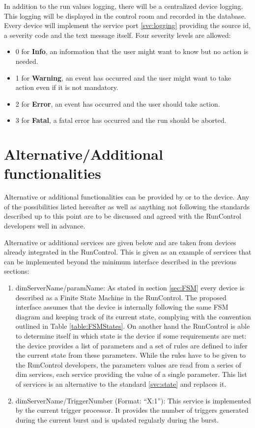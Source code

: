 \documentclass[a4paper]{article}
\begin{document}
In addition to the run values logging, there will be a centralized device logging. This logging will
be displayed in the control room and recorded in the database. Every device will implement the
service port \ref{svc:logging} providing the source id, a severity code and the
text message itself. Four severity levels are allowed:
\begin{itemize}
	\item 0 for \textbf{Info}, an information that the user might want to know but
	no action is needed.
	\item 1 for \textbf{Warning}, an event has occurred and the user might want to
	take action even if it is not mandatory.
	\item 2 for \textbf{Error}, an event has occurred and the user should take
	action.
	\item 3 for \textbf{Fatal}, a fatal error has occurred and the run should be
	aborted.
\end{itemize}

\section{Alternative/Additional functionalities}
Alternative or additional functionalities can be provided by or to the device. Any of the
possibilities listed hereafter as well as anything not following the standards described
up to this point are to be discussed and agreed with the RunControl developers well in advance.

Alternative or additional services are given below and are taken from devices
already integrated in the RunControl. This is given as an example of services
that can be implemented beyond the minimum interface described in the previous
sections:
\begin{enumerate}[label=\textbf{ASVC.\arabic*}]
	\item \label{svc:stateParams} dimServerName/paramName: As stated in section
	\ref{sec:FSM} every device is described as a Finite State Machine in the
	RunControl. The proposed interface assumes that the device is internally
	following the same FSM diagram and keeping track of its current state,
	complying with the convention outlined in Table \ref{table:FSMStates}. On
	another hand the RunControl is able to determine itself in which state is the
	device if some requirements are met: the device provides a list of parameters
	and a set of rules are defined to infer the current state from these
	parameters.
	While the rules have to be given to the RunControl developers, the parameters
	values are read from a series of dim services, each service providing the
	value of a single parameter. This list of services is an alternative to the
	standard \ref{svc:state} and replaces it.
	\item dimServerName/TriggerNumber (Format: ``X:1''): This service is
	implemented by the current trigger processor. It provides the number of
	triggers generated during the current burst and is updated regularly during
	the burst.
\end{enumerate}
\end{document}
